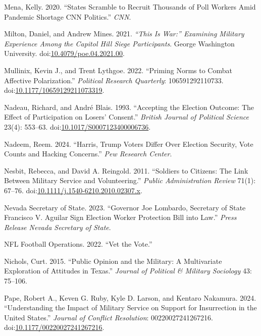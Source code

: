 \documentclass[
  12pt,
  letterpaper,
]{article}
\newlength{\cslhangindent}
\newenvironment{CSLReferences}[2] %
 {\begin{list}{}{%
  \setlength{\itemindent}{0pt}
  \setlength{\leftmargin}{0pt}
  \setlength{\parsep}{0pt}
  \ifodd #1
   \setlength{\leftmargin}{\cslhangindent}
   \setlength{\itemindent}{-1\cslhangindent}
  \fi
  \setlength{\itemsep}{#2\baselineskip}}}
 {\end{list}}
\begin{document}
\begin{CSLReferences}{1}{1}
Mena, Kelly. 2020. {``States Scramble to Recruit Thousands of Poll
Workers Amid Pandemic Shortage {\textbar} {CNN Politics}.''} \emph{CNN}.

Milton, Daniel, and Andrew Mines. 2021. \emph{{``{This} Is {War}:''}
{Examining Military Experience Among} the {Capitol Hill Siege
Participants}}. George Washington University.
doi:\href{https://doi.org/10.4079/poe.04.2021.00}{10.4079/poe.04.2021.00}.

Mullinix, Kevin J., and Trent Lythgoe. 2022. {``Priming {Norms} to
{Combat Affective Polarization}.''} \emph{Political Research Quarterly}:
106591292110733.
doi:\href{https://doi.org/10.1177/10659129211073319}{10.1177/10659129211073319}.

Nadeau, Richard, and André Blais. 1993. {``Accepting the {Election
Outcome}: {The Effect} of {Participation} on {Losers}' {Consent}.''}
\emph{British Journal of Political Science} 23(4): 553--63.
doi:\href{https://doi.org/10.1017/S0007123400006736}{10.1017/S0007123400006736}.

Nadeem, Reem. 2024. {``Harris, {Trump Voters Differ Over Election
Security}, {Vote Counts} and {Hacking Concerns}.''} \emph{Pew Research
Center}.

Nesbit, Rebecca, and David A. Reingold. 2011. {``Soldiers to {Citizens}:
{The Link} Between {Military Service} and {Volunteering}.''}
\emph{Public Administration Review} 71(1): 67--76.
doi:\href{https://doi.org/10.1111/j.1540-6210.2010.02307.x}{10.1111/j.1540-6210.2010.02307.x}.

Nevada Secretary of State. 2023. {``Governor {Joe Lombardo}, {Secretary}
of {State Francisco V}. {Aguilar} Sign {Election Worker Protection Bill}
into Law.''} \emph{Press Release {\textbar} Nevada Secretary of State}.

NFL Football Operations. 2022. {``Vet the {Vote}.''}

Nichols, Curt. 2015. {``Public {Opinion} and the {Military}: {A
Multivariate Exploration} of {Attitudes} in {Texas}.''} \emph{Journal of
Political \& Military Sociology} 43: 75--106.

Pape, Robert A., Keven G. Ruby, Kyle D. Larson, and Kentaro Nakamura.
2024. {``Understanding the {Impact} of {Military Service} on {Support}
for {Insurrection} in the {United States}.''} \emph{Journal of Conflict
Resolution}: 00220027241267216.
doi:\href{https://doi.org/10.1177/00220027241267216}{10.1177/00220027241267216}.


\end{CSLReferences}
\end{document}
